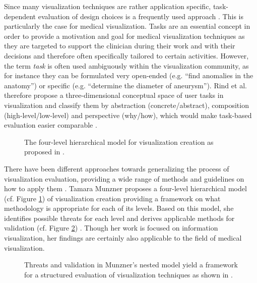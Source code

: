 Since many visualization techniques are rather application specific, task-dependent evaluation of design choices is a frequently used approach \cite{Lam:2012:EmpiricalStudies}.
This is particularly the case for medical visualization.
Tasks are an essential concept in order to provide a motivation and goal for medical visualization techniques as they are targeted to support the clinician during their work and with their decisions and therefore often specifically tailored to certain activities.
However, the term \emph{task} is often used ambiguously within the visualization community, as for instance they can be formulated very open-ended (e.g. ``find anomalies in the anatomy'') or specific (e.g. ``determine the diameter of aneurysm'').
Rind et al. therefore propose a three-dimensional conceptual space of user tasks in visualization and classify them by abstraction (concrete/abstract), composition (high-level/low-level) and perspective (why/how), which would make task-based evaluation easier comparable \cite{Rind:2014:Tasks}.

\begin{figure}[ht]
	\centering
	
	\caption{
		The four-level hierarchical model for visualization creation as proposed in \cite{Munzner:2009:NestedModel}.
	}
	\label{fig:background:munzner-nestedmodel1}
\end{figure}

There have been different approaches towards generalizing the process of visualization evaluation, providing a wide range of methods and guidelines on how to apply them \cite{Kerren:2008:EvaluatingInformationVisualization, Plaisant:2004:ChallengeEvaluation}.
Tamara Munzner proposes a four-level hierarchical model (cf. Figure \ref{fig:background:munzner-nestedmodel1}) of visualization creation providing a framework on what methodology is appropriate for each of its levels.
Based on this model, she identifies possible threats for each level and derives applicable methods for validation (cf. Figure \ref{fig:background:munzner-nestedmodel2}) \cite{Munzner:2009:NestedModel}.
Though her work is focused on information visualization, her findings are certainly also applicable to the field of medical visualization.

\begin{figure}[ht]
	\centering
	
	\caption{
		Threats and validation in Munzner's nested model yield a framework for a structured evaluation of visualization techniques as shown in \cite{Munzner:2009:NestedModel}.
	}
	\label{fig:background:munzner-nestedmodel2}
\end{figure}

